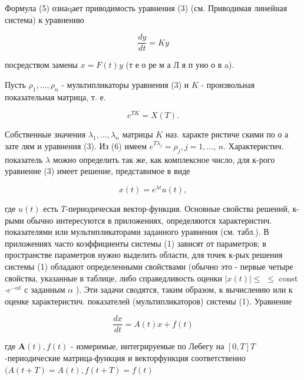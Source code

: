 \documentclass[10pt]{article}
\begin{document}
Формула (5) ознаqает приводимость уравнения (3) (см. Приводимая линейная система) к уравнению



\[

\frac{d y}{d t}=K y

\]



посредством замены $x=F(t) y$ (т е о ре м а Л я п уно о в a).



Пусть $\rho_{1}, \ldots, \rho_{n}$ - мультипликаторы уравнения (3) и $K$ - произвольная показательная матрица, т. е.



\[

e^{T K}=X(T) .

\]



Собственные значения $\lambda_{1}, \ldots, \lambda_{n}$ матрицы $K$ наз. характе ристиче скими по о а зате лям и уравнения (3). Из (6) имеем $e^{T \lambda_{j}}=\rho_{j}, j=1, \ldots$, $n$. Характеристич. показатель $\lambda$ можно определить так же, как комплексное число, для к-рого уравнение (3) имеет решение, представимое в виде



\[

x(t)=e^{\lambda t} u(t),

\]



где $u(t)$ есть $T$-периодическая вектор-функция. Основные свойства решений, к-рыми обычно интересуются в приложениях, определяются характеристич. показателями или мультипликаторами заданного уравнения (см. табл.). В приложениях часто коэффициенты системы (1) зависят от параметров; в пространстве параметров нужно выделить области, для точек к-рых решения системы (1) обладают определенными свойствами (обычно это - первые четыре свойства, указанные в таблице, либо справедливость оценки $|x(t)| \leqslant$ $\leqslant$ const $\cdot e^{-\alpha t}$ с заданным $\alpha$ ). Эти задачи сводятся, таким образом, к вычислению или к оценке характеристич. показателей (мультипликаторов) системы (1). Уравнение



\[

\frac{d x}{d t}=A(t) x+f(t)

\]



где $\boldsymbol{A}(t), f(t)$ - измеримые, интегрируемые по Лебегу на $[0, T] T$-периодические матрица-функция и векторфункция соответственно $(A(t+T)=A(t), f(t+T)=f(t)$
\end{document}
